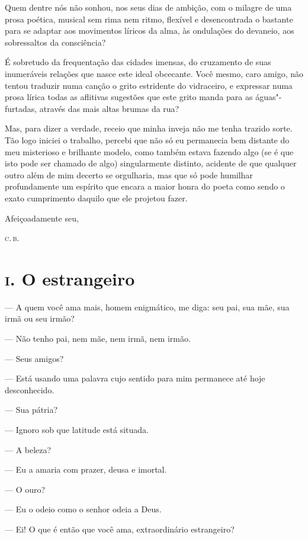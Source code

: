 Quem dentre nós não sonhou, nos seus dias de ambição, com o milagre de
uma prosa poética, musical sem rima nem ritmo, flexível e
desencontrada o bastante para se adaptar aos movimentos líricos da
alma, às ondulações do devaneio, aos sobressaltos da consciência?

É sobretudo da frequentação
das cidades imensas, do cruzamento de suas
inumeráveis relações que nasce este ideal obcecante. Você mesmo, 
caro amigo, não tentou traduzir numa canção o grito estridente do
vidraceiro, e expressar numa prosa lírica todas as aflitivas sugestões
que este grito manda para as águas"-furtadas, através das mais altas
brumas da rua?

Mas, para dizer a verdade, receio que minha inveja não me tenha trazido
sorte. Tão logo iniciei o trabalho, percebi que não só eu
permanecia bem distante do meu misterioso e brilhante modelo, como
também estava fazendo algo (se é que isto pode ser chamado de algo)
singularmente distinto, acidente de que qualquer outro além de mim
decerto se orgulharia, mas que só pode humilhar profundamente um
espírito que encara a maior honra do poeta como sendo o exato
cumprimento daquilo que ele projetou fazer.

\begin{flushright}
Afeiçoadamente seu,

\textsc{c.\,b.}
\end{flushright}


\chapter{\textsc{i.} O estrangeiro}

--- A quem você ama mais, homem enigmático, me diga: seu pai, sua mãe, sua
irmã ou seu irmão?

--- Não tenho pai, nem mãe, nem irmã, nem irmão.

--- Seus amigos?

--- Está usando uma palavra cujo sentido para mim permanece
até hoje desconhecido.

--- Sua pátria?

--- Ignoro sob que latitude está situada.

--- A beleza?

--- Eu a amaria com prazer, deusa e imortal.

--- O ouro?

--- Eu o odeio como o senhor odeia a Deus.

--- Ei! O que é então que você ama, extraordinário estrangeiro?

